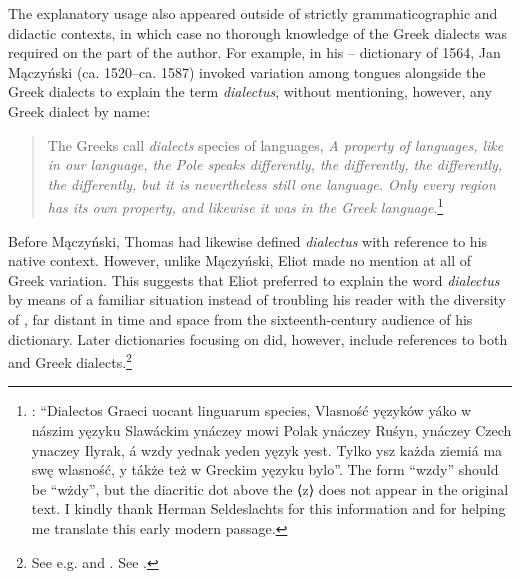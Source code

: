 The explanatory usage also appeared outside of strictly grammaticographic and didactic contexts, in which case no thorough knowledge of the Greek dialects was required on the part of the author. For example, in his – dictionary of 1564, Jan Mączyński (ca. 1520–ca. 1587) invoked variation among  tongues alongside the Greek dialects to explain the  term \textit{dialectus}, without mentioning, however, any Greek dialect by name:

\begin{quote}
The Greeks call \textit{dialects} species of languages, \textit{A property of languages, like in our  language, the Pole speaks differently, the  differently, the  differently, the  differently, but it is nevertheless still one language. Only every region has its own property, and likewise it was in the Greek language}.\footnote{\citet[ \textit{s.v.} “dialectus”]{Maczynski1564}: “Dialectos Graeci uocant linguarum species, Vlasność yęzyków yáko w nászim yęzyku Slawáckim ynáczey mowi Polak ynáczey Ruśyn, ynáczey Czech ynaczey Ilyrak, á wzdy yednak yeden yęzyk yest. Tylko ysz każda ziemiá ma swę wlasność, y tákże też w Greckim yęzyku bylo”. The form “wzdy” should be “wżdy”, but the diacritic dot above the ⟨z⟩ does not appear in the original text. I kindly thank Herman Seldeslachts for this information and for helping me translate this early modern  passage.}
\end{quote}

Before Mączyński, Thomas \citet[\textsc{xxxiii}\textsc{\textsuperscript{v}}]{Eliot1538} had likewise defined \textit{dialectus} with reference to his native context. However, unlike Mączyński, Eliot made no mention at all of Greek variation. This suggests that Eliot preferred to explain the  word \textit{dialectus} by means of a familiar situation instead of troubling his reader with the diversity of , far distant in time and space from the sixteenth-century  audience of his dictionary. Later dictionaries focusing on  did, however, include references to both  and Greek dialects.\footnote{See e.g. \citet[\textit{s.v.} “dialect”]{Bullokar1616} and \citet[\textit{s.v.} “dialect”]{Blount1656}. See \citet[7]{Blank1996}.}

